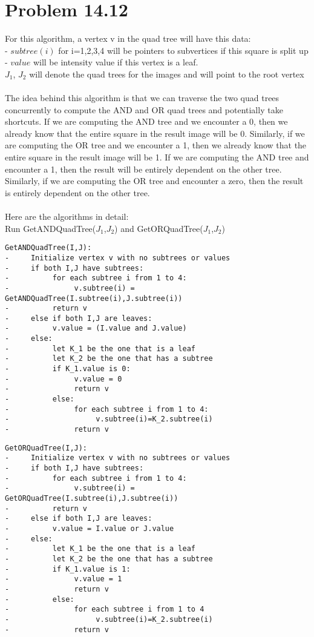 \documentclass[11pt,psfig]{article}
\begin{document}
\newpage

\section*{Problem 14.12}

For this algorithm, a vertex v in the quad tree will have this data:\\
- $subtree(i)$ for i=1,2,3,4 will be pointers to subvertices if this square is split up\\
- $value$ will be intensity value if this vertex is a leaf. \\
$J_1$, $J_2$ will denote the quad trees for the images and will point to the root vertex \\
\\
The idea behind this algorithm is that we can traverse the two quad trees concurrently to compute the AND and OR quad trees and potentially take shortcuts. If we are computing the AND tree and we encounter a 0, then we already know that the entire square in the result image will be 0. Similarly, if we are computing the OR tree and we encounter a 1, then we already know that the entire square in the result image will be 1. If we are computing the AND tree and encounter a 1, then the result will be entirely dependent on the other tree. Similarly, if we are computing the OR tree and encounter a zero, then the result is entirely dependent on the other tree.\\
\\
Here are the algorithms in detail:\\
Run GetANDQuadTree($J_1$,$J_2$) and GetORQuadTree($J_1$,$J_2$)
\begin{verbatim}
GetANDQuadTree(I,J):
-     Initialize vertex v with no subtrees or values
-     if both I,J have subtrees:
-          for each subtree i from 1 to 4:
-               v.subtree(i) = GetANDQuadTree(I.subtree(i),J.subtree(i))
-          return v
-     else if both I,J are leaves:
-          v.value = (I.value and J.value)
-     else:
-          let K_1 be the one that is a leaf
-          let K_2 be the one that has a subtree
-          if K_1.value is 0:
-               v.value = 0
-               return v
-          else:
-               for each subtree i from 1 to 4:
-                    v.subtree(i)=K_2.subtree(i)
-               return v
\end{verbatim}
\newpage
\begin{verbatim}
GetORQuadTree(I,J):
-     Initialize vertex v with no subtrees or values
-     if both I,J have subtrees:
-          for each subtree i from 1 to 4:
-               v.subtree(i) = GetORQuadTree(I.subtree(i),J.subtree(i))
-          return v
-     else if both I,J are leaves:
-          v.value = I.value or J.value
-     else:
-          let K_1 be the one that is a leaf
-          let K_2 be the one that has a subtree
-          if K_1.value is 1:
-               v.value = 1
-               return v
-          else:
-               for each subtree i from 1 to 4
-                    v.subtree(i)=K_2.subtree(i)
-               return v

\end{verbatim}


\end{document}
